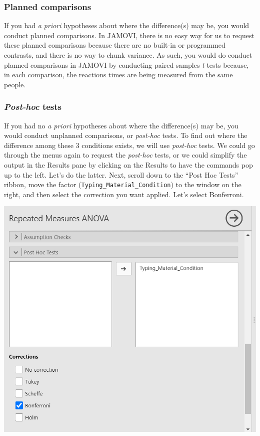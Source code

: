 \documentclass[
]{book}
\begin{document}
\hypertarget{planned-comparisons-2}{%
\subsubsection{Planned comparisons}\label{planned-comparisons-2}}

If you had \emph{a priori} hypotheses about where the difference(s) may be, you would conduct planned comparisons. In JAMOVI, there is no easy way for us to request these planned comparisons because there are no built-in or programmed contrasts, and there is no way to chunk variance. As such, you would do conduct planned comparisons in JAMOVI by conducting paired-samples \emph{t}-tests because, in each comparison, the reactions times are being measured from the same people.

\hypertarget{post-hoc-tests}{%
\subsubsection{\texorpdfstring{\emph{Post-hoc} tests}{Post-hoc tests}}\label{post-hoc-tests}}

If you had no \emph{a priori} hypotheses about where the difference(s) may be, you would conduct unplanned comparisons, or \emph{post-hoc} tests. To find out where the difference among these 3 conditions exists, we will use \emph{post-hoc} tests.
We could go through the menus again to request the \emph{post-hoc} tests, or we could simplify the output in the Results pane by clicking on the Results to have the commands pop up to the left. Let's do the latter. Next, scroll down to the ``Post Hoc Tests'' ribbon, move the factor (\texttt{Typing\_Material\_Condition}) to the window on the right, and then select the correction you want applied. Let's select {Bonferroni}.

\includegraphics{img/RM_ANOVA_PostHocCommands.png}
\end{document}
